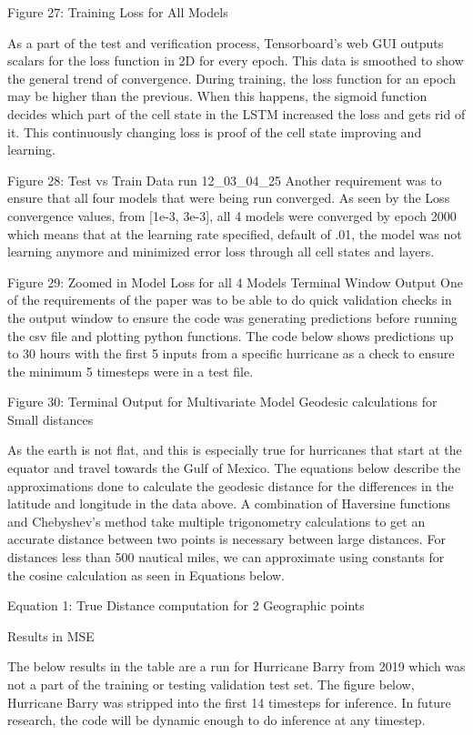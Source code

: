 \documentclass{article}
\begin{document}
Figure 27: Training Loss for All Models

As a part of the test and verification process, Tensorboard’s web GUI outputs scalars for the loss function in 2D for every epoch. This data is smoothed to show the general trend of convergence. During training, the loss function for an epoch may be higher than the previous. When this happens, the sigmoid function decides which part of the cell state in the LSTM increased the loss and gets rid of it. This continuously changing loss is proof of the cell state improving and learning.


Figure 28: Test vs Train Data run 12_03_04_25
Another requirement was to ensure that all four models that were being run converged. As seen by the Loss convergence values, from [1e-3, 3e-3], all 4 models were converged by epoch 2000 which means that at the learning rate specified, default of .01, the model was not learning anymore and minimized error loss through all cell states and layers.


Figure 29: Zoomed in Model Loss for all 4 Models
Terminal Window Output
One of the requirements of the paper was to be able to do quick validation checks in the output window to ensure the code was generating predictions before running the csv file and plotting python functions.
The code below shows predictions up to 30 hours with the first 5 inputs from a specific hurricane as a check to ensure the minimum 5 timesteps were in a test file.


Figure 30: Terminal Output for Multivariate Model
Geodesic calculations for Small distances

As the earth is not flat, and this is especially true for hurricanes that start at the equator and travel towards the Gulf of Mexico. The equations below describe the approximations done to calculate the geodesic distance for the differences in the latitude and longitude in the data above. A combination of Haversine functions and Chebyshev’s method take multiple trigonometry calculations to get an accurate distance between two points is necessary between large distances. For distances less than 500 nautical miles, we can approximate using constants for the cosine calculation as seen in Equations below.


Equation 1: True Distance computation for 2 Geographic points

Results in MSE

The below results in the table are a run for Hurricane Barry from 2019 which was not a part of the training or testing validation test set. The figure below, Hurricane Barry was stripped into the first 14 timesteps for inference. In future research, the code will be dynamic enough to do inference at any timestep. 
\end{document}
